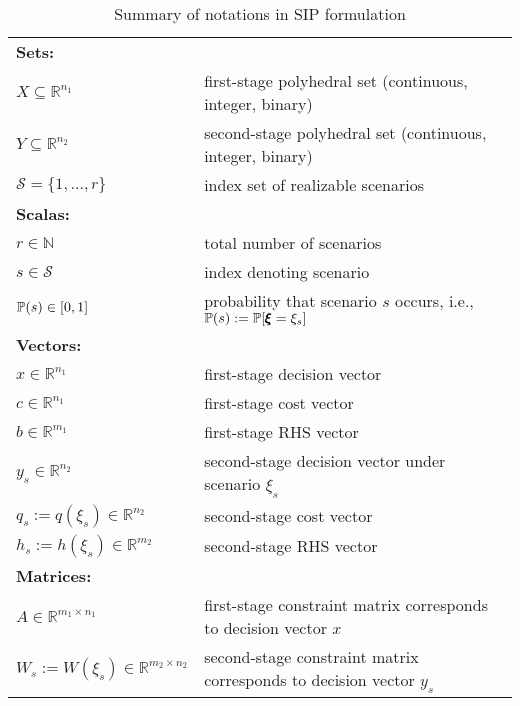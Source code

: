 \begin{table}[]
	\resizebox{\textwidth}{!}
	{
		\begin{threeparttable}
			\caption{Summary of notations in SIP formulation}
			\label{notation:SIP}
			\begin{tabular}{ll}
				\toprule
				\multicolumn{2}{l}{\textbf{Sets:}} \\ 
				$X\subseteq\mathbb{R}^{n_1}$	& first-stage polyhedral set (continuous, integer, binary)\\
				$Y\subseteq\mathbb{R}^{n_2}$	& second-stage polyhedral set (continuous, integer, binary)\\ 
				$\mathcal{S}=\{1,\ldots,r\}$	& index set of realizable scenarios \\ \midrule
				\multicolumn{2}{l}{\textbf{Scalas:}} \\ 
				$r\in\mathbb{N}$	& total number of scenarios	\\	
				$s\in\mathcal{S}$	& index denoting scenario	\\
				$\operatorname*{\mathbb{P}}(s)\in[0,1]$ & probability that scenario $s$ occurs, i.e., $\operatorname*{\mathbb{P}}(s):=\operatorname*{\mathbb{P}}[\pmb{\xi}=\xi_s]$ \\ \midrule
				\multicolumn{2}{l}{\textbf{Vectors:}} \\  
				$x\in\mathbb{R}^{n_1}$	& first-stage decision vector	\\
				$c\in \mathbb{R}^{n_1}$	& first-stage cost vector\\
				$b\in\mathbb{R}^{m_1}$	& first-stage RHS vector\\
				$y_s\in\mathbb{R}^{n_2}$	& second-stage decision vector under scenario $\xi_s$	\\
				$q_s:= q(\xi_s)\in\mathbb{R}^{n_2}$	& second-stage cost vector \\
				$h_s:= h(\xi_s)\in\mathbb{R}^{m_2}$	& second-stage RHS vector\\ \midrule
				\multicolumn{2}{l}{\textbf{Matrices:}} \\  
				$A\in\mathbb{R}^{m_1\times n_1}$	& first-stage constraint matrix corresponds to decision vector $x$\\
				$W_s:= W(\xi_s)\in\mathbb{R}^{m_2\times n_2}$	& second-stage constraint matrix corresponds to decision vector $y_s$\\

\end{tabular}
\end{threeparttable}}
\end{table}
